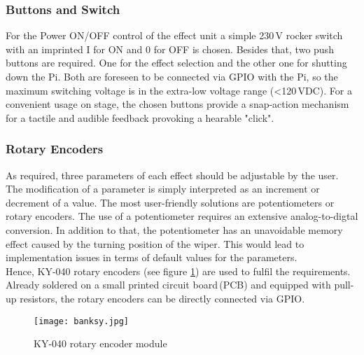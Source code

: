 

\subsubsection{Buttons and Switch} 

For the Power ON/OFF control of the effect unit a simple 230\,V rocker switch with an
imprinted I for ON and 0 for OFF is chosen. Besides that, two push buttons are required.
One for the effect selection and the other one for shutting down the Pi.
Both are foreseen to be connected via GPIO with the Pi, so the maximum switching voltage is
in the extra-low voltage range (<120\,VDC). For a convenient usage on stage, the chosen buttons provide
a snap-action mechanism for a tactile and audible feedback provoking a hearable "click".


\subsubsection{Rotary Encoders} 

As required, three parameters of each effect should be adjustable by the user.
The modification of a parameter is simply interpreted as an increment or decrement of a value.
The most user-friendly solutions are potentiometers or rotary encoders.
The use of a potentiometer requires an extensive analog-to-digtal conversion. In addition to that, the
potentiometer has an unavoidable memory effect caused by the turning position of the wiper.
This would lead to implementation issues in terms of default values for the parameters.\\

Hence, KY-040 rotary encoders (see figure \ref{fig:RotaryEncoder}) are used to fulfil the requirements.
Already soldered on a small printed circuit board\,(PCB) and equipped with pull-up resistors, the rotary encoders can be directly connected via GPIO.

\begin{figure}[H]
	\centering \texttt{[image: banksy.jpg]}
	\caption[RotaryEncoder]{KY-040 rotary encoder module\footnotemark}
	\label{fig:RotaryEncoder}
\end{figure} 

